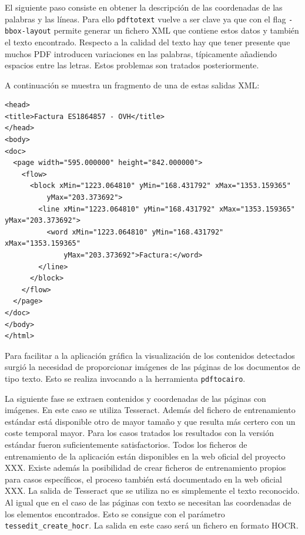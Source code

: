 El siguiente paso consiste en obtener la descripción de las coordenadas de las palabras y las líneas. Para ello \verb|pdftotext| vuelve a ser clave ya que con el flag \verb|-bbox-layout| permite generar un fichero XML que contiene estos datos y también el texto encontrado. Respecto a la calidad del texto hay que tener presente que muchos PDF introducen variaciones en las palabras, típicamente añadiendo espacios entre las letras. Estos problemas son tratados posteriormente.

A continuación se muestra un fragmento de una de estas salidas XML:

\begin{verbatim}
<head>
<title>Factura ES1864857 - OVH</title>
</head>
<body>
<doc>
  <page width="595.000000" height="842.000000">
    <flow>
      <block xMin="1223.064810" yMin="168.431792" xMax="1353.159365" 
          yMax="203.373692">
        <line xMin="1223.064810" yMin="168.431792" xMax="1353.159365" yMax="203.373692">
          <word xMin="1223.064810" yMin="168.431792" xMax="1353.159365" 
              yMax="203.373692">Factura:</word>
        </line>
      </block>
    </flow>
  </page>
</doc>
</body>
</html>
\end{verbatim}


Para facilitar a la aplicación gráfica la visualización de los contenidos detectados surgió la necesidad de proporcionar imágenes de las páginas de los documentos de tipo texto. Esto se realiza invocando a la herramienta \verb|pdftocairo|. 

La siguiente fase se extraen contenidos y coordenadas de las páginas con imágenes. En este caso se utiliza Tesseract. Además del fichero de entrenamiento estándar está disponible otro de mayor tamaño y que resulta más certero con un coste temporal mayor. Para los casos tratados los resultados con la versión estándar fueron suficientemente satisfactorios. Todos los ficheros de entrenamiento de la aplicación están disponibles en la web oficial del proyecto XXX. Existe además la posibilidad de crear ficheros de entrenamiento propios para casos específicos, el proceso también está documentado en la web oficial XXX. La salida de Tesseract que se utiliza no es simplemente el texto reconocido. Al igual que en el caso de las páginas con texto se necesitan las coordenadas de los elementos encontrados. Esto se consigue con el parámetro \verb|tessedit_create_hocr|. La salida en este caso será un fichero en formato HOCR.

